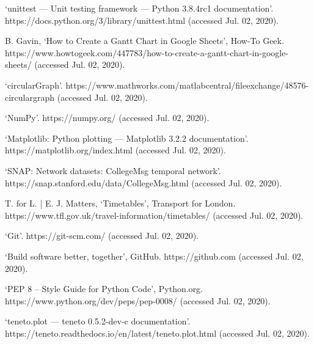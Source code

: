 \begin{thebibliography}{30}
‘unittest — Unit testing framework — Python 3.8.4rc1 documentation’. https://docs.python.org/3/library/unittest.html (accessed Jul. 02, 2020).

B. Gavin, ‘How to Create a Gantt Chart in Google Sheets’, How-To Geek. https://www.howtogeek.com/447783/how-to-create-a-gantt-chart-in-google-sheets/ (accessed Jul. 02, 2020).

‘circularGraph’. https://www.mathworks.com/matlabcentral/fileexchange/48576-circulargraph (accessed Jul. 02, 2020).

‘NumPy’. https://numpy.org/ (accessed Jul. 02, 2020).

‘Matplotlib: Python plotting — Matplotlib 3.2.2 documentation’. https://matplotlib.org/index.html (accessed Jul. 02, 2020).

‘SNAP: Network datasets: CollegeMsg temporal network’. https://snap.stanford.edu/data/CollegeMsg.html (accessed Jul. 02, 2020).

T. for L. | E. J. Matters, ‘Timetables’, Transport for London. https://www.tfl.gov.uk/travel-information/timetables/ (accessed Jul. 02, 2020).

‘Git’. https://git-scm.com/ (accessed Jul. 02, 2020).

‘Build software better, together’, GitHub. https://github.com (accessed Jul. 02, 2020).

‘PEP 8 -- Style Guide for Python Code’, Python.org. https://www.python.org/dev/peps/pep-0008/ (accessed Jul. 02, 2020).

‘teneto.plot — teneto 0.5.2-dev-c documentation’. https://teneto.readthedocs.io/en/latest/teneto.plot.html (accessed Jul. 02, 2020).

\end{thebibliography}
\vspace{1cm}